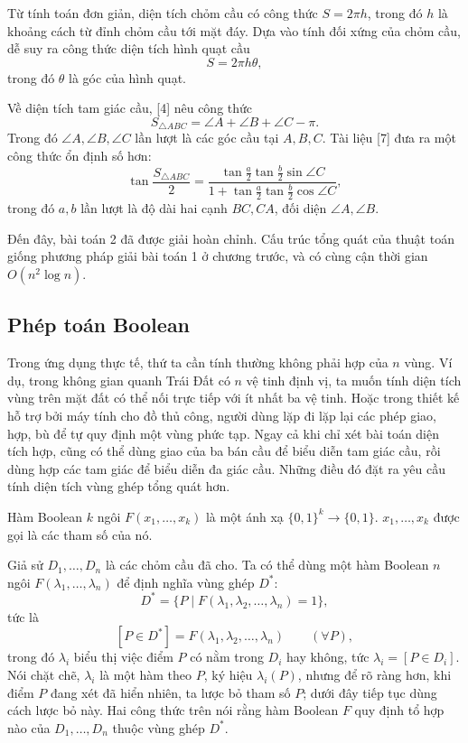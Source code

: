 \documentclass[11pt]{article}
\begin{document}
Từ tính toán đơn giản, diện tích chỏm cầu có công thức \(S=2\pi h\), trong đó
\(h\) là khoảng cách từ đỉnh chỏm cầu tới mặt đáy. Dựa vào tính đối xứng của
chỏm cầu, dễ suy ra công thức diện tích hình quạt cầu
\[
  S=2\pi h\theta,
\]
trong đó \(\theta\) là góc của hình quạt.

Về diện tích tam giác cầu, [4] nêu công thức
\[
  S_{\triangle ABC}=\angle A+\angle B+\angle C-\pi.
\]
Trong đó \(\angle A,\angle B,\angle C\) lần lượt là các góc cầu tại
\(A,B,C\). Tài liệu [7] đưa ra một công thức ổn định số hơn:
\[
  \tan\frac{S_{\triangle ABC}}{2}
  =
  \frac{\tan\frac a2 \tan\frac b2\sin\angle C}
  {1+\tan\frac a2 \tan\frac b2\cos\angle C},
\]
trong đó \(a,b\) lần lượt là độ dài hai cạnh \(BC,CA\), đối diện
\(\angle A,\angle B\).

Đến đây, bài toán 2 đã được giải hoàn chỉnh. Cấu trúc tổng quát của thuật toán
giống phương pháp giải bài toán 1 ở chương trước, và có cùng cận thời gian
\(O(n^2\log n)\).

\subsection{Phép toán Boolean}

Trong ứng dụng thực tế, thứ ta cần tính thường không phải hợp của \(n\) vùng.
Ví dụ, trong không gian quanh Trái Đất có \(n\) vệ tinh định vị, ta muốn tính
diện tích vùng trên mặt đất có thể nối trực tiếp với ít nhất ba vệ tinh. Hoặc
trong thiết kế hỗ trợ bởi máy tính cho đồ thủ công, người dùng lặp đi lặp lại
các phép giao, hợp, bù để tự quy định một vùng phức tạp. Ngay cả khi chỉ xét
bài toán diện tích hợp, cũng có thể dùng giao của ba bán cầu để biểu diễn tam
giác cầu, rồi dùng hợp các tam giác để biểu diễn đa giác cầu. Những điều đó đặt
ra yêu cầu tính diện tích vùng ghép tổng quát hơn.

Hàm Boolean \(k\) ngôi \(F(x_1,\ldots,x_k)\) là một ánh xạ
\(\{0,1\}^k\to\{0,1\}\). \(x_1,\ldots,x_k\) được gọi là các tham số của nó.

Giả sử \(D_1,\ldots,D_n\) là các chỏm cầu đã cho. Ta có thể dùng một hàm
Boolean \(n\) ngôi \(F(\lambda_1,\ldots,\lambda_n)\) để định nghĩa vùng ghép
\(D^*\):
\[
  D^*=\{P\mid F(\lambda_1,\lambda_2,\ldots,\lambda_n)=1\},
\]
tức là
\[
  [P\in D^*]=F(\lambda_1,\lambda_2,\ldots,\lambda_n)\qquad(\forall P),
\]
trong đó \(\lambda_i\) biểu thị việc điểm \(P\) có nằm trong \(D_i\) hay không,
tức \(\lambda_i=[P\in D_i]\). Nói chặt chẽ, \(\lambda_i\) là một hàm theo
\(P\), ký hiệu \(\lambda_i(P)\), nhưng để rõ ràng hơn, khi điểm \(P\) đang xét
đã hiển nhiên, ta lược bỏ tham số \(P\); dưới đây tiếp tục dùng cách lược bỏ
này. Hai công thức trên nói rằng hàm Boolean \(F\) quy định tổ hợp nào của
\(D_1,\ldots,D_n\) thuộc vùng ghép \(D^*\).
\end{document}
